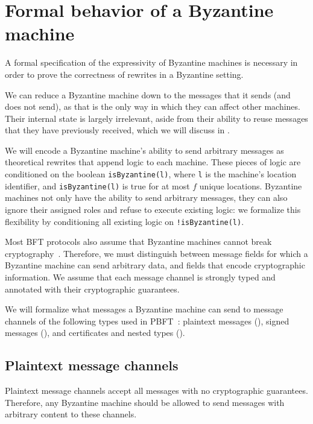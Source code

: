 \section{Formal behavior of a Byzantine machine}
\label{sec:bft-formalism}
A formal specification of the expressivity of Byzantine machines is necessary in order to prove the correctness of rewrites in a Byzantine setting.

We can reduce a Byzantine machine down to the messages that it sends (and does not send), as that is the only way in which they can affect other machines.
Their internal state is largely irrelevant, aside from their ability to reuse messages that they have previously received, which we will discuss in .

We will encode a Byzantine machine's ability to send arbitrary messages as theoretical rewrites that append logic to each machine.
These pieces of logic are conditioned on the boolean \texttt{isByzantine(l)}, where \texttt{l} is the machine's location identifier, and \texttt{isByzantine(l)} is true for at most $f$ unique locations.
Byzantine machines not only have the ability to send arbitrary messages, they can also ignore their assigned roles and refuse to execute existing logic: we formalize this flexibility by conditioning all existing logic on \texttt{!isByzantine(l)}.

Most BFT protocols also assume that Byzantine machines cannot break cryptography~\cite{pbft}.
Therefore, we must distinguish between message fields for which a Byzantine machine can send arbitrary data, and fields that encode cryptographic information.
We assume that each message channel is strongly typed and annotated with their cryptographic guarantees.

We will formalize what messages a Byzantine machine can send to message channels of the following types used in PBFT~\cite{pbft}: plaintext messages (), signed messages (), and certificates and nested types ().

\subsection{Plaintext message channels}
\label{sec:plaintext-channels-formalism}
Plaintext message channels accept all messages with no cryptographic guarantees.
Therefore, any Byzantine machine should be allowed to send messages with arbitrary content to these channels.

